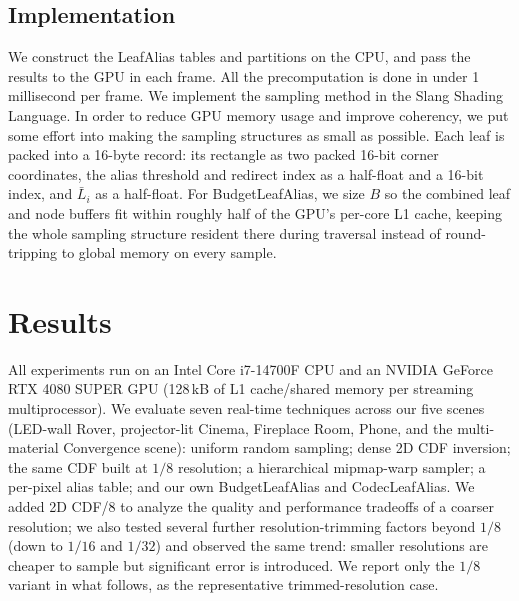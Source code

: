 \documentclass[acmtog,review]{acmart}
\begin{document}
\subsection{Implementation}
\label{sec:impl}
We construct the LeafAlias tables and partitions on the CPU, and pass the results to the GPU in each frame.
All the precomputation is done in under 1 millisecond per frame. We implement the sampling method in the Slang Shading Language.
In order to reduce GPU memory usage and improve coherency, we put some effort into making the sampling structures as small as possible.
Each leaf is packed into a 16-byte record: its rectangle as two packed 16-bit corner coordinates, the alias threshold and redirect index
as a half-float and a 16-bit index, and $\bar{L}_i$ as a half-float. For BudgetLeafAlias, we size $B$ so the combined leaf and node buffers fit within roughly half of the GPU's per-core L1 cache, keeping the whole sampling structure resident there during
traversal instead of round-tripping to global memory on every sample. 

\section{Results} \label{sec:results}

All experiments run on an Intel Core i7-14700F CPU and an NVIDIA GeForce RTX 4080 SUPER GPU (128\,kB of L1 cache/shared memory per streaming
multiprocessor). We evaluate seven real-time techniques across our five scenes
(LED-wall Rover, projector-lit Cinema, Fireplace Room, Phone, and the multi-material
Convergence scene): uniform random sampling; dense 2D CDF inversion; the same CDF built at $1/8$ resolution; a hierarchical
mipmap-warp sampler; a per-pixel alias table; and our
own {BudgetLeafAlias} and {CodecLeafAlias}. We added 2D CDF/8 to analyze the quality and performance
tradeoffs of a coarser resolution; we also tested several further resolution-trimming factors beyond $1/8$ (down to $1/16$ and $1/32$)
and observed the same trend: smaller resolutions are cheaper to sample but significant error is introduced. We report only the $1/8$ variant in what follows, as the representative trimmed-resolution case.
\end{document}
